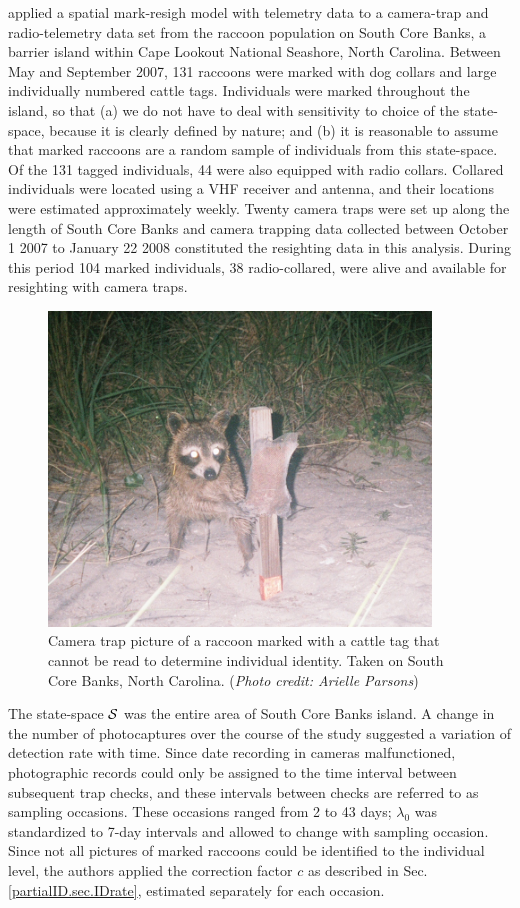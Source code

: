 \citet{sollmann_etal:2012ecol} applied a spatial mark-resigh model
with telemetry data to a camera-trap and radio-telemetry data set from
the raccoon population on South Core Banks, a barrier island within
Cape Lookout National Seashore, North Carolina. Between May and
September 2007, 131 raccoons were marked with dog collars and large
individually numbered cattle tags. Individuals were marked throughout
the island, so that (a) we do not have to deal with sensitivity to
choice of the state-space, because it is clearly defined by nature;
and (b) it is reasonable to assume that marked raccoons are a random
sample of individuals from this state-space.  Of the 131 tagged
individuals, 44 were also equipped with radio collars. Collared
individuals were located using a VHF receiver and antenna, and their
locations were estimated approximately weekly. Twenty camera traps
were set up along the length of South Core Banks and camera trapping
data collected between October 1 2007 to January 22 2008 constituted
the resighting data in this analysis. During this period 104 marked
individuals, 38 radio-collared, were alive and available for
resighting with camera traps.

\begin{figure}[ht]
  \centering
  \includegraphics[width=4in]{Ch19-PartialID/figs/Raccoon_pic.png}
  \caption{Camera trap picture of a raccoon marked with a cattle tag that cannot be read to determine individual identity. Taken on South Core Banks, North Carolina.
({\it Photo credit: Arielle Parsons})}
  \label{partialID.fig.raccoon}
\end{figure}

The state-space ${\cal S}$ was the entire area of South Core Banks
island. A change in the number of photocaptures over the course of the
study suggested a variation of detection rate with time. Since date
recording in cameras malfunctioned, photographic records could only be
assigned to the time interval between subsequent trap checks, and
these intervals between checks are referred to as sampling
occasions. These occasions ranged from 2 to 43 days; $\lambda_0$ was
standardized to 7-day intervals and allowed to change with sampling
occasion. Since not all pictures of marked raccoons could be
identified to the individual level, the authors applied the correction
factor $c$ as described in Sec. \ref{partialID.sec.IDrate}, estimated
separately for each occasion.

